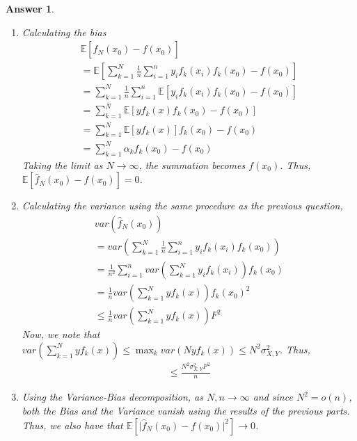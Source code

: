 \documentclass[12pt]{article}
\theoremstyle{colon}
\newtheorem*{answer}{Answer}
\begin{document}
\begin{answer}
  \leavevmode
  \begin{enumerate}[label=\arabic*)]
    \item Calculating the bias
      \begin{gather*}
        \mathbb{E}[\widehat{f}_N(x_0) - f(x_0)] \\
        = \mathbb{E}[\sum_{k=1}^N \frac{1}{n} \sum_{i=1}^n y_i f_k(x_i) f_k(x_0) - f(x_0)] \\
        = \sum_{k=1}^N \frac{1}{n} \sum_{i=1}^n \mathbb{E}[y_i f_k(x_i) f_k(x_0) - f(x_0)] \\
        = \sum_{k=1}^N \mathbb{E}[y f_k(x) f_k(x_0) - f(x_0)] \\
        = \sum_{k=1}^N \mathbb{E}[y f_k(x)] f_k(x_0) - f(x_0) \\
        = \sum_{k=1}^N \alpha_k f_k(x_0) - f(x_0)
      \end{gather*}
      Taking the limit as $N \rightarrow \infty$, the summation becomes $f(x_0)$. Thus, $\mathbb{E}[\widehat{f}_N(x_0) - f(x_0)] = 0$.
    \item Calculating the variance using the same procedure as the previous question,
      \begin{gather*}
        var(\widehat{f}_N(x_0)) \\
        = var(\sum_{k=1}^N \frac{1}{n} \sum_{i=1}^n y_i f_k(x_i) f_k(x_0)) \\
        = \frac{1}{n^2} \sum_{i=1}^n var(\sum_{k=1}^N y_i f_k(x_i)) f_k(x_0) \\
        = \frac{1}{n} var(\sum_{k=1}^N y f_k(x)) f_k(x_0)^2 \\
        \leq \frac{1}{n} var(\sum_{k=1}^N y f_k(x)) F^2
      \end{gather*}
      Now, we note that $var(\sum_{k=1}^N y f_k(x)) \leq \max_k var(N y f_k(x)) \leq N^2 \sigma_{X,Y}^2$. Thus,
      \begin{gather*}
        \leq \frac{N^2 \sigma_{X,Y}^2 F^2}{n}
      \end{gather*}
    \item Using the Variance-Bias decomposition, as $N, n \rightarrow \infty$ and since $N^2 = o(n)$, both the Bias and the Variance vanish using the results of the previous parts. Thus, we also have that $\mathbb{E}[\lvert \widehat{f}_N(x_0) - f(x_0) \rvert^2] \rightarrow 0$.
  \end{enumerate}
\end{answer}

\clearpage
\end{document}
